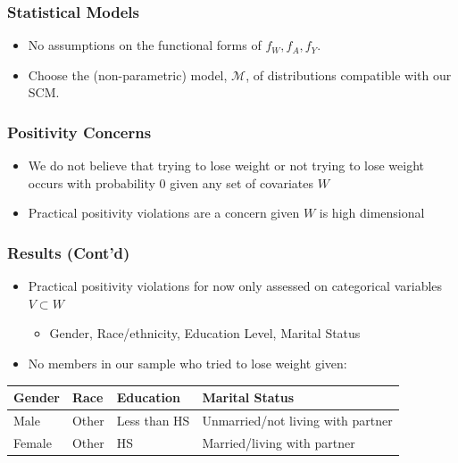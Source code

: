\documentclass{beamer}
\newcommand{\M}{\mathcal{M}}
\begin{document}
\begin{frame}
 \frametitle{Statistical Models}
 \begin{itemize}
  \item No assumptions on the functional forms of $f_W, f_A, f_Y$.
  \item Choose the (non-parametric) model, $\M$, of distributions compatible with our SCM.
 \end{itemize}
\end{frame}

\begin{frame}
\frametitle{Positivity Concerns}
\begin{itemize}
 \item We do not believe that trying to lose weight or not trying to lose weight occurs with probability $0$ given any set of  covariates $W$
 \item Practical positivity violations are a concern given $W$ is high dimensional
\end{itemize}
\end{frame}

\begin{frame}
\frametitle{Results (Cont'd)}
\begin{itemize}
 \item Practical positivity violations for now only assessed on categorical variables $V\subset W$
 \begin{itemize}
  \item Gender, Race/ethnicity, Education Level, Marital Status
 \end{itemize}
 \item No members in our sample who tried to lose weight given:
\end{itemize}
\begin{tabular}{| l | l | l | l |}
\hline
 Gender & Race & Education & Marital Status \\
\hline
Male & Other & Less than HS & Unmarried/not living with partner \\
Female & Other & HS & Married/living with partner \\
\hline
\end{tabular}
\end{frame}
\end{document}
